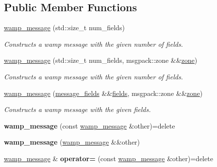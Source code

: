 \subsection*{Public Member Functions}
\begin{DoxyCompactItemize}
\item 
\hyperlink{classautobahn_1_1wamp__message_abc8ebed60c771d68f8713ce382499ae0}{wamp\+\_\+message} (std\+::size\+\_\+t num\+\_\+fields)
\begin{DoxyCompactList}\small\item\em Constructs a wamp message with the given number of fields. \end{DoxyCompactList}\item 
\hyperlink{classautobahn_1_1wamp__message_a0a84ab10bd0d1311c45f61735ca9e01a}{wamp\+\_\+message} (std\+::size\+\_\+t num\+\_\+fields, msgpack\+::zone \&\&\hyperlink{classautobahn_1_1wamp__message_ae8db458e6c133012e4caceefb56ff263}{zone})
\begin{DoxyCompactList}\small\item\em Constructs a wamp message with the given number of fields. \end{DoxyCompactList}\item 
\hyperlink{classautobahn_1_1wamp__message_ac808886c6c4d6c8520fbec12dbb6c037}{wamp\+\_\+message} (\hyperlink{classautobahn_1_1wamp__message_a2986ec144b289c128508c0e839d81147}{message\+\_\+fields} \&\&\hyperlink{classautobahn_1_1wamp__message_a7101933c7dadd25ba5f022854b53d3d8}{fields}, msgpack\+::zone \&\&\hyperlink{classautobahn_1_1wamp__message_ae8db458e6c133012e4caceefb56ff263}{zone})
\begin{DoxyCompactList}\small\item\em Constructs a wamp message with the given fields. \end{DoxyCompactList}\item 
{\bfseries wamp\+\_\+message} (const \hyperlink{classautobahn_1_1wamp__message}{wamp\+\_\+message} \&other)=delete\hypertarget{classautobahn_1_1wamp__message_a6b72612e30f56c2d6003b772bd1e51f1}{}\label{classautobahn_1_1wamp__message_a6b72612e30f56c2d6003b772bd1e51f1}

\item 
{\bfseries wamp\+\_\+message} (\hyperlink{classautobahn_1_1wamp__message}{wamp\+\_\+message} \&\&other)\hypertarget{classautobahn_1_1wamp__message_a20010988bd5420af0086fa6523a342e4}{}\label{classautobahn_1_1wamp__message_a20010988bd5420af0086fa6523a342e4}

\item 
\hyperlink{classautobahn_1_1wamp__message}{wamp\+\_\+message} \& {\bfseries operator=} (const \hyperlink{classautobahn_1_1wamp__message}{wamp\+\_\+message} \&other)=delete\hypertarget{classautobahn_1_1wamp__message_a647777a6ae25dfa7c7e8e3b62b577792}{}\label{classautobahn_1_1wamp__message_a647777a6ae25dfa7c7e8e3b62b577792}


\end{DoxyCompactItemize}
